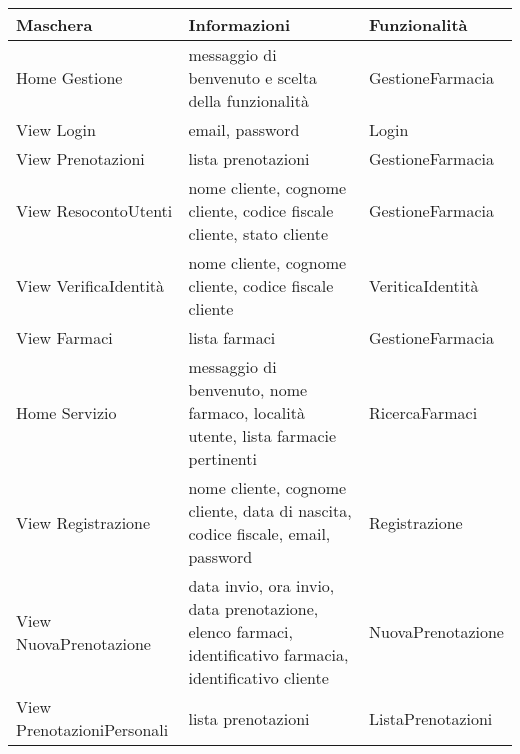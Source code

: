 \begin{tabular} {|P{5cm}|P{7cm}|P{4cm}|}
    \hline
    \textbf{Maschera}          & \textbf{Informazioni}                                                                                     & \textbf{Funzionalità} \\
    \hline
    Home Gestione              & messaggio di benvenuto e scelta della funzionalità                                                        & GestioneFarmacia      \\
    \hline
    View Login                 & email, password                                                                                           & Login                 \\
    \hline
    View Prenotazioni          & lista prenotazioni                                                                                        & GestioneFarmacia      \\
    \hline
    View ResocontoUtenti       & nome cliente, cognome cliente, codice fiscale cliente, stato cliente                                      & GestioneFarmacia      \\
    \hline
    View VerificaIdentità      & nome cliente, cognome cliente, codice fiscale cliente                                                     & VeriticaIdentità      \\
    \hline
    View Farmaci               & lista farmaci                                                                                             & GestioneFarmacia      \\
    \hline
    Home Servizio              & messaggio di benvenuto, nome farmaco, località utente, lista farmacie pertinenti                          & RicercaFarmaci        \\
    \hline
    View Registrazione         & nome cliente, cognome cliente, data di nascita, codice fiscale, email, password                           & Registrazione         \\
    \hline
    View NuovaPrenotazione     & data invio, ora invio, data prenotazione, elenco farmaci, identificativo farmacia, identificativo cliente & NuovaPrenotazione     \\
    \hline
    View PrenotazioniPersonali & lista prenotazioni                                                                                        & ListaPrenotazioni     \\
    \hline
\end{tabular}
\hfill \break
\hfill \break

